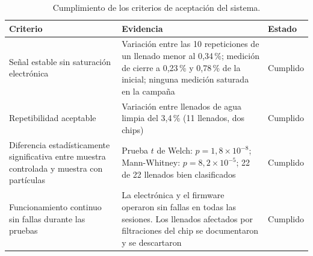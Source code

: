 \begin{table}[htbp]
  \centering
  \caption{Cumplimiento de los criterios de aceptación del sistema.}
  \label{tab:criterios}
  \small
  \begin{tabular}{p{}p{}p{}}
    \hline
    Criterio & Evidencia & Estado \\
    \hline
    Señal estable sin saturación electrónica &
      Variación entre las 10 repeticiones de un llenado menor al 0,34\,\%; medición de
      cierre a 0,23\,\% y 0,78\,\% de la inicial; ninguna medición saturada en la campaña &
      Cumplido \\
    Repetibilidad aceptable &
      Variación entre llenados de agua limpia del 3,4\,\% (11 llenados, dos chips) &
      Cumplido \\
    Diferencia estadísticamente significativa entre muestra controlada y muestra con
      partículas &
      Prueba $t$ de Welch: $p = 1{,}8 \times 10^{-8}$; Mann-Whitney:
      $p = 8{,}2 \times 10^{-5}$; 22 de 22 llenados bien clasificados &
      Cumplido \\
    Funcionamiento continuo sin fallas durante las pruebas &
      La electrónica y el firmware operaron sin fallas en todas las sesiones. Los llenados
      afectados por filtraciones del chip se documentaron y se descartaron &
      Cumplido \\
    \hline
  \end{tabular}
\end{table}

